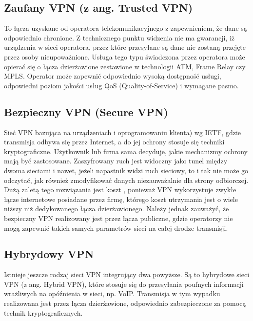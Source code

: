 \documentclass[12pt]{article}
\begin{document}
    \subsection{Zaufany VPN (z ang. Trusted VPN)}
    To łącza uzyskane od operatora telekomunikacyjnego z zapewnieniem, że dane są odpowiednio chronione. Z technicznego punktu widzenia nie ma gwarancji, iż urządzenia w sieci operatora, przez które przesyłane są dane nie zostaną przejęte przez osoby nieupoważnione. Usługa tego typu świadczona przez operatora może opierać się o łącza dzierżawione zestawione w technologii ATM, Frame Relay czy MPLS. Operator może zapewnić odpowiednio wysoką dostępność usługi, odpowiedni poziom jakości usług QoS (Quality-of-Service) i wymagane pasmo.
    
    
    \subsection{Bezpieczny VPN (Secure VPN)}
    Sieć VPN bazująca na urządzeniach i oprogramowaniu klienta) wg IETF, gdzie transmisja odbywa się przez Internet, a do jej ochrony stosuje się techniki kryptograficzne. Użytkownik lub firma sama decyduje, jakie mechanizmy ochrony mają być zastosowane. Zaszyfrowany ruch jest widoczny jako tunel między dwoma sieciami i nawet, jeżeli napastnik widzi ruch sieciowy, to i tak nie może go odczytać, jak również zmodyfikować danych niezauważalnie dla strony odbiorczej. Dużą zaletą tego rozwiązania jest koszt , ponieważ VPN wykorzystuje zwykłe łącze internetowe posiadane przez firmę, którego koszt utrzymania jest o wiele niższy niż dedykowanego łącza dzierżawionego. Należy jednak zauważyć, że bezpieczny VPN realizowany jest przez łącza publiczne, gdzie operatorzy nie mogą zapewnić takich samych parametrów sieci na całej drodze transmisji.
    
    \subsection{Hybrydowy VPN}
    Istnieje jeszcze rodzaj sieci VPN integrujący dwa powyższe. Są to hybrydowe sieci VPN (z ang. Hybrid VPN), które stosuje się do przesyłania poufnych informacji wrażliwych na opóźnienia w sieci, np. VoIP. Transmisja w tym wypadku realizowana jest przez łącza dzierżawione, odpowiednio zabezpieczone za pomocą technik kryptograficznych.
    
\end{document}
